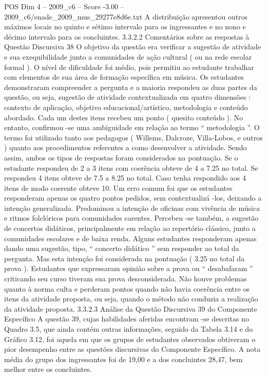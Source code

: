 \begin{textsample}{POS Dim 4 – 2009\_c6 – Score -3.00 – 2009\_c6/enade\_2009\_mus\_29277e8d6e.txt}
A distribuição apresentou outros máximos locais no quinto e sétimo intervalo para os ingressantes e no nono e décimo intervalo para os concluintes. 3.3.2.2 Comentários sobre as respostas à Questão Discursiva 38 O objetivo da questão era verificar a sugestão de atividade e sua exequibilidade junto a comunidades de ação cultural ( ou na rede escolar formal ).
O nível de dificuldade foi médio, pois permitiu ao estudante trabalhar com elementos de sua área de formação específica em música.
Os estudantes demonstraram compreender a pergunta e a maioria respondeu as duas partes da questão, ou seja, sugestão de atividade contextualizada em quatro dimensões : contexto de aplicação, objetivo educacional/artístico, metodologia e conteúdo abordado.
Cada um destes itens recebeu um ponto ( quesito conteúdo ).
No entanto, confirmou -se uma ambiguidade em relação ao termo “ metodologia ”.
O termo foi utilizado tanto aos pedagogos ( Willems, Dalcroze, Villa-Lobos, e outros ) quanto aos procedimentos referentes a como desenvolver a atividade.
Sendo assim, ambos os tipos de respostas foram considerados na pontuação.
Se o estudante respondeu de 2 a 3 itens com coerência obteve de 4 a 7.25 no total.
Se respondeu 4 itens obteve de 7.5 a 8.25 no total.
Caso tenha respondido aos 4 itens de modo coerente obteve 10.
Um erro comum foi que os estudantes responderam apenas os quatro pontos pedidos, sem contextualizá -los, deixando a intenção generalizada.
Predominou a intenção de oficinas com vivência de música e ritmos folclóricos para comunidades carentes.
Percebeu -se também, a sugestão de concertos didáticos, principalmente em relação ao repertório clássico, junto a comunidades escolares e de baixa renda.
Alguns estudantes responderam apenas dando uma sugestão, tipo, “ concerto didático ” sem responder ao total da pergunta.
Mas esta intenção foi considerada na pontuação ( 3.25 no total da prova ).
Estudantes que expressaram opinião sobre a prova ou “ desabafaram ” criticando seu curso tiveram sua prova desconsiderada.
Não houve problemas quanto à norma culta e perderam pontos quando não havia coerência entre os itens da atividade proposta, ou seja, quando o método não conduzia a realização da atividade proposta. 3.3.2.3 Análise da Questão Discursiva 39 do Componente Específico A questão 39, cujas habilidades aferidas encontram -se descritas no Quadro 3.5, que ainda contém outras informações, seguido da Tabela 3.14 e do Gráfico 3.12, foi aquela em que os grupos de estudantes observados obtiveram o pior desempenho entre as questões discursivas do Componente Específico.
A nota média do grupo dos ingressantes foi de 19,00 e a dos concluintes 28,47, bem melhor entre os concluintes.

\end{textsample}
